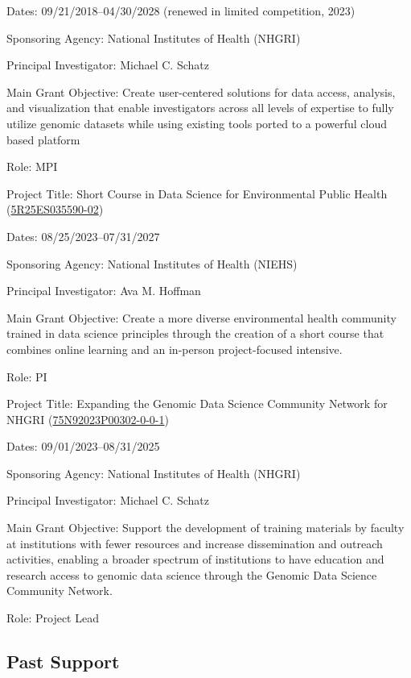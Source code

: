 \documentclass{cv}
\begin{document}
Dates: 09/21/2018--04/30/2028 (renewed in limited competition, 2023)

Sponsoring Agency: National Institutes of Health (NHGRI)

Principal Investigator: Michael C. Schatz

Main Grant Objective: Create user-centered solutions for data access, analysis, and visualization that enable investigators across all levels of expertise to fully utilize genomic datasets while using existing tools ported to a powerful cloud based platform

Role: MPI

\vspace{5mm}

Project Title: Short Course in Data Science for Environmental Public Health (\href{https://reporter.nih.gov/search/n8pPuYzcskWEltb40MVBkA/project-details/10746327}{5R25ES035590-02})

Dates: 08/25/2023--07/31/2027

Sponsoring Agency: National Institutes of Health (NIEHS)

Principal Investigator: Ava M. Hoffman

Main Grant Objective: Create a more diverse environmental health community trained in data science principles through the creation of a short course that combines online learning and an in-person project-focused intensive.

Role: PI

\vspace{5mm}

Project Title: Expanding the Genomic Data Science Community Network for NHGRI (\href{https://reporter.nih.gov/search/hBYvgxL2yUO5iw9lGMoYTA/project-details/10944109}{75N92023P00302-0-0-1})

Dates: 09/01/2023--08/31/2025

Sponsoring Agency: National Institutes of Health (NHGRI)

Principal Investigator: Michael C. Schatz

Main Grant Objective: Support the development of training materials by faculty at institutions with fewer resources and increase dissemination and outreach activities, enabling a broader spectrum of institutions to have education and research access to genomic data science through the Genomic Data Science Community Network.

Role: Project Lead

\subsection*{Past Support}
\end{document}
